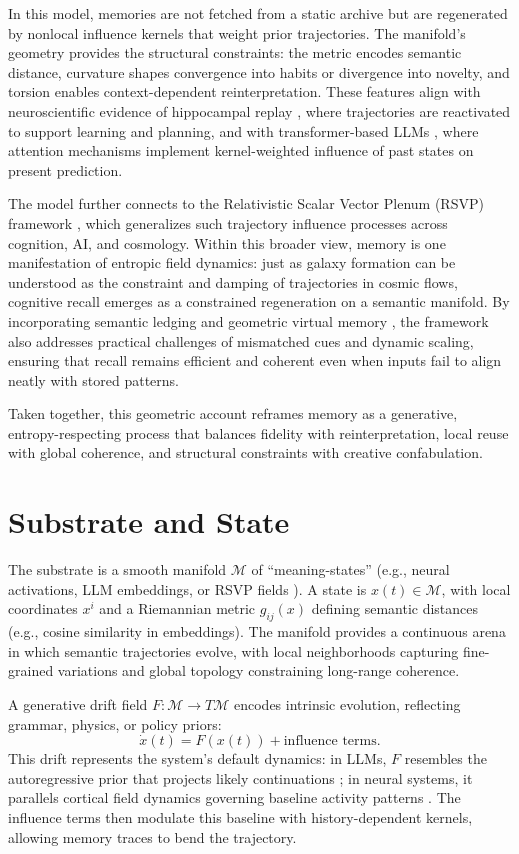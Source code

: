 \documentclass[a4paper,12pt]{article}
\newcommand{\M}{\mathcal{M}}
\begin{document}
In this model, memories are not fetched from a static archive but are regenerated by 
nonlocal influence kernels that weight prior trajectories. The manifold’s geometry 
provides the structural constraints: the metric encodes semantic distance, curvature 
shapes convergence into habits or divergence into novelty, and torsion enables 
context-dependent reinterpretation. These features align with neuroscientific 
evidence of hippocampal replay \citep{hassabis2007patients}, where trajectories 
are reactivated to support learning and planning, and with transformer-based LLMs 
\citep{vaswani2017attention}, where attention mechanisms implement kernel-weighted 
influence of past states on present prediction. 

The model further connects to the Relativistic Scalar Vector Plenum (RSVP) framework 
\citep{semantic2025}, which generalizes such trajectory influence processes across 
cognition, AI, and cosmology. Within this broader view, memory is one manifestation 
of entropic field dynamics: just as galaxy formation can be understood as the 
constraint and damping of trajectories in cosmic flows, cognitive recall emerges as 
a constrained regeneration on a semantic manifold. By incorporating semantic ledging 
and geometric virtual memory \citep{kuijper2021geometric}, the framework also 
addresses practical challenges of mismatched cues and dynamic scaling, ensuring 
that recall remains efficient and coherent even when inputs fail to align neatly 
with stored patterns. 

Taken together, this geometric account reframes memory as a generative, 
entropy-respecting process that balances fidelity with reinterpretation, 
local reuse with global coherence, and structural constraints with creative 
confabulation.

\section{Substrate and State}
The substrate is a smooth manifold $\M$ of ``meaning-states'' (e.g., neural activations, 
LLM embeddings, or RSVP fields \citep{semantic2025}). A state is $x(t) \in \M$, with local 
coordinates $x^i$ and a Riemannian metric $g_{ij}(x)$ defining semantic distances 
(e.g., cosine similarity in embeddings). The manifold provides a continuous arena in 
which semantic trajectories evolve, with local neighborhoods capturing fine-grained 
variations and global topology constraining long-range coherence.

A generative drift field $F: \M \to T\M$ encodes intrinsic evolution, reflecting grammar, 
physics, or policy priors:
\[
\dot{x}(t) = F(x(t)) + \text{influence terms}.
\]
This drift represents the system’s default dynamics: in LLMs, $F$ resembles the 
autoregressive prior that projects likely continuations \citep{vaswani2017attention}; 
in neural systems, it parallels cortical field dynamics governing baseline activity 
patterns \citep{amari1977dynamics}. The influence terms then modulate this baseline 
with history-dependent kernels, allowing memory traces to bend the trajectory.
\end{document}
